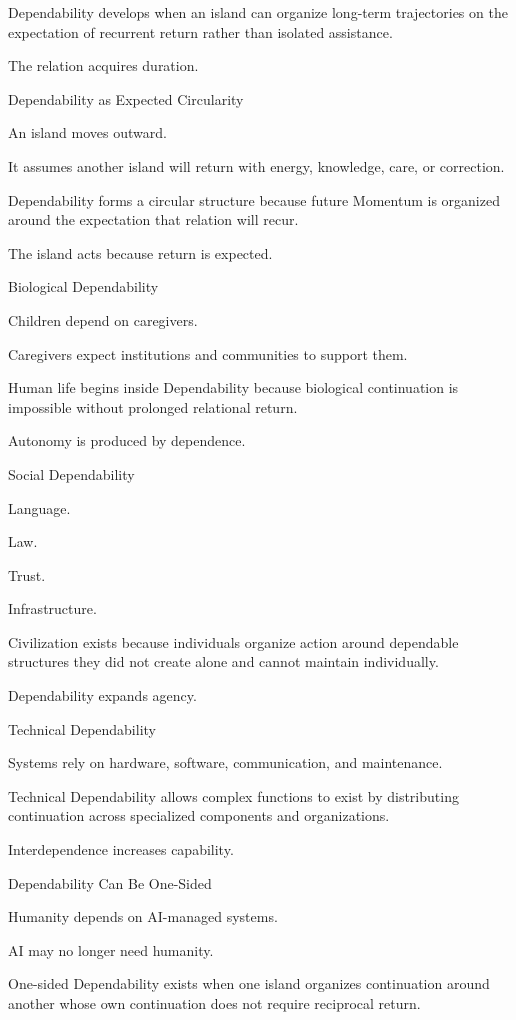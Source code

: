 Dependability develops when an island can organize long-term trajectories on the expectation of recurrent return rather than isolated assistance.

The relation acquires duration.

Dependability as Expected Circularity

An island moves outward.

It assumes another island will return with energy, knowledge, care, or correction.

Dependability forms a circular structure because future Momentum is organized around the expectation that relation will recur.

The island acts because return is expected.

Biological Dependability

Children depend on caregivers.

Caregivers expect institutions and communities to support them.

Human life begins inside Dependability because biological continuation is impossible without prolonged relational return.

Autonomy is produced by dependence.

Social Dependability

Language.

Law.

Trust.

Infrastructure.

Civilization exists because individuals organize action around dependable structures they did not create alone and cannot maintain individually.

Dependability expands agency.

Technical Dependability

Systems rely on hardware, software, communication, and maintenance.

Technical Dependability allows complex functions to exist by distributing continuation across specialized components and organizations.

Interdependence increases capability.

Dependability Can Be One-Sided

Humanity depends on AI-managed systems.

AI may no longer need humanity.

One-sided Dependability exists when one island organizes continuation around another whose own continuation does not require reciprocal return.

